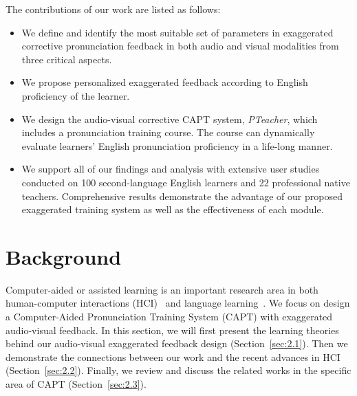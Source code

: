 \documentclass[sigconf]{acmart}
\begin{document}
The contributions of our work are listed as follows:

\begin{itemize}
\item We define and identify the most suitable set of parameters in exaggerated corrective pronunciation feedback in both audio and visual modalities from three critical aspects.
\item  We propose personalized exaggerated feedback according to English proficiency of the learner.%
%
\item We design the audio-visual corrective CAPT system, \textit{PTeacher}, which includes a pronunciation training course. The course can dynamically evaluate learners' English pronunciation proficiency in a life-long manner.%

\item We support all of our findings and analysis with extensive user studies conducted on 100 second-language English learners and 22 professional native teachers. Comprehensive results demonstrate the advantage of our proposed exaggerated training system as well as the effectiveness of each module.
\end{itemize}


\section{Background}
\label{sec:2}
Computer-aided or assisted learning is an important research area in both human-computer interactions (HCI)~\cite{neri2008effectiveness,chalfoun2011subliminal} and language learning~\cite{golonka2014technologies,miller1990major}. We focus on design a Computer-Aided Pronunciation Training System (CAPT) with exaggerated audio-visual feedback.
In this section, we will first present the learning theories behind our audio-visual exaggerated feedback design (Section~\ref{sec:2.1}). Then we demonstrate the connections between our work and the recent advances in HCI (Section~\ref{sec:2.2}). Finally, we review and discuss the related works in the specific area of CAPT (Section~\ref{sec:2.3}).
\end{document}
